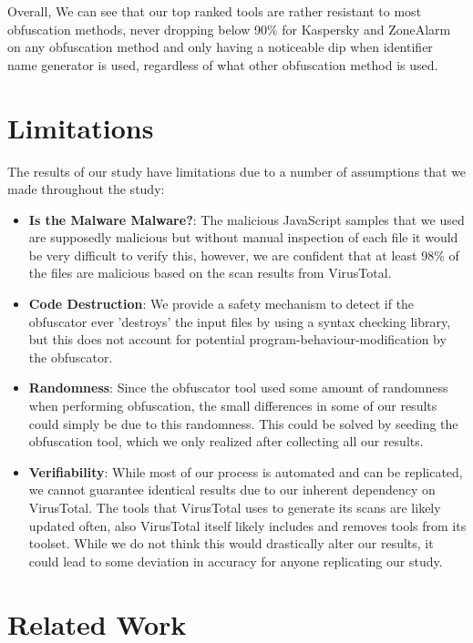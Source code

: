 \documentclass[sigplan,10pt,review, nonacm=true]{acmart}\settopmatter{printfolios=true,printccs=false,printacmref=false}
\begin{document}
Overall, We can see that our top ranked tools are rather resistant to most obfuscation methods, never dropping below 90\% for Kaspersky and ZoneAlarm on any obfuscation method and only having a noticeable dip when identifier name generator is used, regardless of what other obfuscation method is used.


\section{Limitations}
The results of our study have limitations due to a number of assumptions that we made throughout the study:
\begin{itemize}
    \item \textbf{Is the Malware Malware?}: The malicious JavaScript samples that we used are supposedly malicious but without manual inspection of each file it would be very difficult to verify this, however, we are confident that at least 98\% of the files are malicious based on the scan results from VirusTotal.
    \item \textbf{Code Destruction}: We provide a safety mechanism to detect if the obfuscator ever 'destroys' the input files by using a syntax checking library, but this does not account for potential program-behaviour-modification by the obfuscator.
    \item \textbf{Randomness}: Since the obfuscator tool used some amount of randomness when performing obfuscation, the small differences in some of our results could simply be due to this randomness. This could be solved by seeding the obfuscation tool, which we only realized after collecting all our results.
    \item \textbf{Verifiability}: While most of our process is automated and can be replicated, we cannot guarantee identical results due to our inherent dependency on VirusTotal. The tools that VirusTotal uses to generate its scans are likely updated often, also VirusTotal itself likely includes and removes tools from its toolset. While we do not think this would drastically alter our results, it could lead to some deviation in accuracy for anyone replicating our study.
\end{itemize}

\section{Related Work}
\end{document}
